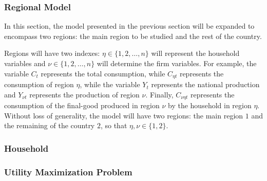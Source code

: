 \documentclass[
thesis.tex
]{subfiles}
\begin{document}
\subsubsection*{Regional Model}


In this section, the model presented in the previous section will be expanded to encompass two regions: the main region to be studied and the rest of the country.

Regions will have two indexes: $\eta \in \{1,2,\ldots,n\}$ will represent the household variables and $\nu \in \{1,2,\ldots,n\}$ will determine the firm variables. For example, the variable $C_{t}$ represents the total consumption, while $C_{\eta t}$ represents the consumption of region $\eta$, while the variable $Y_t$ represents the national production and $Y_{\nu t}$ represents the production of region $\nu$. Finally, $C_{\nu\eta t}$ represents the consumption of the final-good produced in region $\nu$ by the household in region $\eta$. Without loss of generality, the model will have two regions: the main region $1$ and the remaining of the country $2$, so that $\eta,\nu \in \{1,2\}$.



\subsubsection{Household}

\subsubsection*{Utility Maximization Problem}
\end{document}
